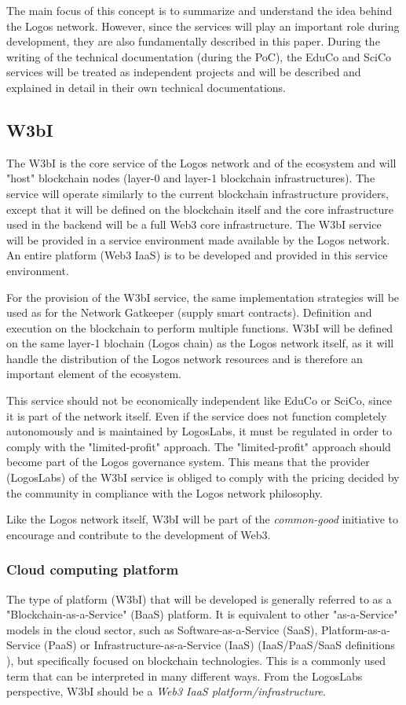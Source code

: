 \documentclass[]{article}
\begin{document}
The main focus of this concept is to summarize and understand the idea behind the Logos network. 
However, since the services will play an important role during development, they are also fundamentally described in this paper. 
During the writing of the technical documentation (during the PoC), the EduCo and SciCo services will be treated as independent projects and will be described and explained in detail in their own technical documentations.

\subsection{W3bI}
The W3bI is the core service of the Logos network and of the ecosystem and will "host" blockchain nodes (layer-0 and layer-1 blockchain infrastructures).
The service will operate similarly to the current blockchain infrastructure providers, except that it will be defined on the blockchain itself and the core infrastructure used in the backend will be a full Web3 core infrastructure.
The W3bI service will be provided in a service environment made available by the Logos network.
An entire platform (Web3 IaaS) is to be developed and provided in this service environment.

For the provision of the W3bI service, the same implementation strategies will be used as for the Network Gatkeeper (supply smart contracts). 
Definition and execution on the blockchain to perform multiple functions.
W3bI will be defined on the same layer-1 blochain (Logos chain) as the Logos network itself, as it will handle the distribution of the Logos network resources and is therefore an important element of the ecosystem. 

This service should not be economically independent like EduCo or SciCo, since it is part of the network itself. 
Even if the service does not function completely autonomously and is maintained by LogosLabs, it must be regulated in order to comply with the "limited-profit" approach.
The "limited-profit" approach should become part of the Logos governance system.
This means that the provider (LogosLabs) of the W3bI service is obliged to comply with the pricing decided by the community in compliance with the Logos network philosophy.

Like the Logos network itself, W3bI will be part of the \textit{common-good} initiative to encourage and contribute to the development of Web3.

\subsubsection{Cloud computing platform}
The type of platform (W3bI) that will be developed is generally referred to as a "Blockchain-as-a-Service" (BaaS) \cite{baas} platform. 
It is equivalent to other "as-a-Service" models in the cloud sector, such as Software-as-a-Service (SaaS), Platform-as-a-Service (PaaS) or Infrastructure-as-a-Service (IaaS) (IaaS/PaaS/SaaS definitions \cite{iaas-paas-saas}), but specifically focused on blockchain technologies.
This is a commonly used term that can be interpreted in many different ways.  
From the LogosLabs perspective, W3bI should be a \textit{Web3 IaaS platform/infrastructure}.
\end{document}
